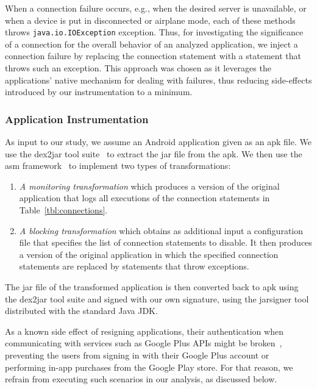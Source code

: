 When a connection failure occurs, e.g., when the desired server is unavailable, or when a device is put in disconnected or airplane mode, each of these methods throws \texttt{java.io.IOException} exception. 
Thus, for investigating the significance of a connection for the overall behavior of an analyzed application, we inject a connection failure by replacing the connection statement with a statement that throws such an exception. 
This approach was chosen as it leverages the applications' native mechanism for dealing with failures, thus reducing side-effects introduced by our instrumentation to a minimum.

\subsubsection{Application Instrumentation}
As input to our study, we assume an Android application given as an apk file. 
We use the dex2jar tool suite~\cite{dex2jar} to extract the jar file from the apk.
We then use the asm framework~\cite{asm} to implement two types of transformations: 
\begin{enumerate}[leftmargin=0.5cm]%
\item \emph{A monitoring transformation} which produces a version of the original application that logs all executions of the connection statements in Table~\ref{tbl:connections}. 
\item \emph{A blocking transformation} which obtains as additional input a configuration file that specifies the list of connection statements to disable. It then produces a version of the original application in which the specified connection statements are replaced by statements that throw exceptions.
\end{enumerate}
The jar file of the transformed application is then converted back to apk using the dex2jar tool suite and signed with our own signature, using the jarsigner tool distributed with the standard Java JDK.
 
As a known side effect of resigning applications, their authentication when communicating with services such as Google Plus APIs might be broken~\cite{googleAPI}, preventing the users from signing in with their Google Plus account or performing in-app purchases from the Google Play store. For that reason, we refrain from executing such scenarios in our analysis, as discussed below. 

